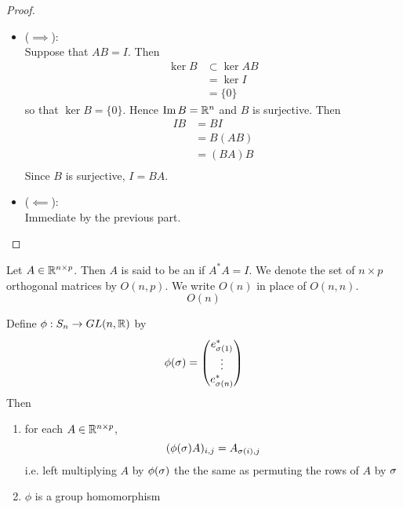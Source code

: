 \documentclass{book}
\begin{document}
	\begin{proof}\
		\begin{itemize}
			\item ($\implies$): \\
			Suppose that $AB = I$. Then  
			\begin{align*}
				\ker B 
				& \subset \ker AB \\
				& = \ker I \\
				& = \{0\}
			\end{align*}
			so that $\ker B = \{0\}$. Hence $\text{Im} \, B = \mathbb{R}^n$ and $B$ is surjective. Then 
			\begin{align*}
				I B
				& = BI \\
				& = B(AB) \\
				& = (BA) B \\
			\end{align*}
			Since $B$ is surjective, $I = BA$. 
			\item ($\impliedby$): \\
			Immediate by the previous part.
		\end{itemize}
	\end{proof}

	\begin{defn}
		Let $A \in \mathbb{R}^{n \times p}$. Then $A$ is said to be an  if $A^*A = I$. We denote the set of $n \times p$ orthogonal matrices by $O(n, p)$. We write $O(n)$ in place of $O(n, n)$.
		$$O(n)$$
	\end{defn}

	\begin{ex}
		Define $\phi: S_n \rightarrow GL(n, \mathbb{R})$ by 
		$$\phi(\sigma) = 
		\begin{pmatrix}
			e_{\sigma(1)}^* \\
			\vdots \\
			e_{\sigma(n)}^*
		\end{pmatrix}
		$$
		Then 
		\begin{enumerate}
			\item for each $A \in \mathbb{R}^{n \times p}$, 
			$$ (\phi(\sigma) A)_{i,j}	= A_{\sigma(i), j} $$
			i.e. left multiplying $A$ by $\phi(\sigma)$ the the same as permuting the rows of $A$ by $\sigma$
			\item $\phi$ is a group homomorphism
		\end{enumerate}
	\end{ex}
\end{document}
